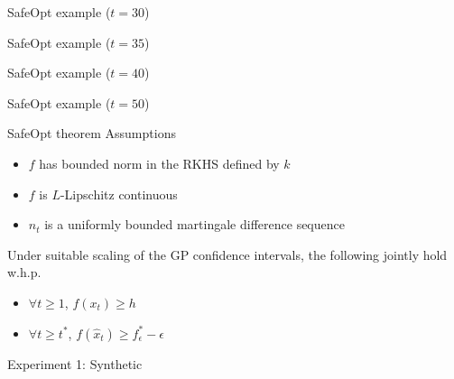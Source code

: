 \documentclass[xetex,10pt,mathserif,handout]{beamer}
\newlength\figureheight
\newlength\figurewidth
\begin{document}
\begin{frame}{SafeOpt example ($t = 30$)}
  \centering
  \setlength\figurewidth{5in}
  \setlength\figureheight{3.5in}
  
\end{frame}

\begin{frame}{SafeOpt example ($t = 35$)}
  \centering
  \setlength\figurewidth{5in}
  \setlength\figureheight{3.5in}
  
\end{frame}

\begin{frame}{SafeOpt example ($t = 40$)}
  \centering
  \setlength\figurewidth{5in}
  \setlength\figureheight{3.5in}
  
\end{frame}

\begin{frame}{SafeOpt example ($t = 50$)}
  \centering
  \setlength\figurewidth{5in}
  \setlength\figureheight{3.5in}
  
\end{frame}

\begin{frame}{SafeOpt theorem}
Assumptions
\vspace{1em}
\begin{itemize}
  \item $f$ has bounded norm in the RKHS defined by $k$
  \vspace{1em}
  \item $f$ is $L$-Lipschitz continuous
  \vspace{1em}
  \item $n_t$ is a uniformly bounded martingale difference sequence
\end{itemize}
\vspace{2em}
Under suitable scaling of the GP confidence intervals, the following jointly hold w.h.p.
\vspace{1em}
\begin{itemize}
  \item $\forall t \geq 1$, $f(x_t) \geq h$
  \vspace{1em}
  \item $\forall t \geq t^*$, $f(\hat{x}_t) \geq f^*_{\epsilon} - \epsilon$
\end{itemize}
\end{frame}

\begin{frame}{Experiment 1: Synthetic}
\begin{columns}[c]
\centering
\setlength\figurewidth{3in}
\setlength\figureheight{4.3in}

\setlength\figurewidth{2.5in}
\setlength\figureheight{3.7in}

\end{columns}
\end{frame}
\end{document}
